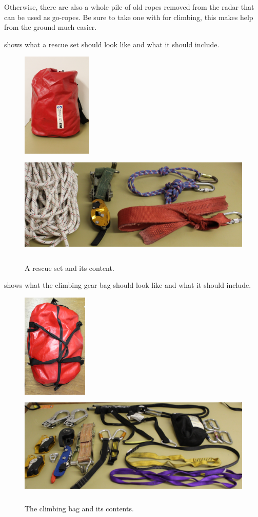 \par
Otherwise, there are also a whole pile of old ropes removed from the radar that can be used as go-ropes. Be sure to take one with for climbing, this makes help from the ground much easier.
\par
{} shows what a rescue set should look like and what it should include.
\begin{figure}[H]
	\centering
	\includegraphics[height=5cm]{images/infrastructure/rescue.jpg}
	\includegraphics[height=5cm]{images/infrastructure/rescue_content.jpg}
	\caption{A rescue set and its content.}
	\label{fig:infra_rescue}
\end{figure}
\par
{} shows what the climbing gear bag should look like and what it should include.
\begin{figure}[H]
	\centering
	\includegraphics[height=5cm]{images/infrastructure/climbing.jpg}
	\includegraphics[height=5cm]{images/infrastructure/climbing_content.jpg}
	\caption{The climbing bag and its contents.}
	\label{fig:infra_climbing}
\end{figure}
